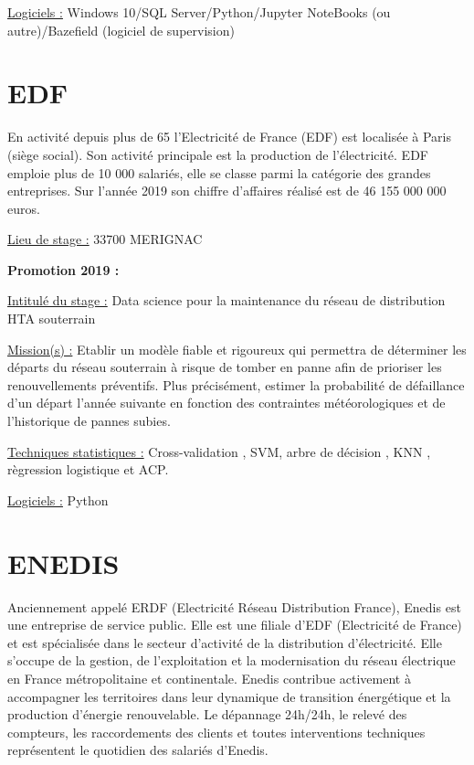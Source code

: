 \documentclass[
  letterpaper,
  DIV=11,
  numbers=noendperiod]{scrreprt}
\begin{document}
\uline{Logiciels :} Windows 10/SQL Server/Python/Jupyter NoteBooks (ou
autre)/Bazefield (logiciel de supervision)

\hypertarget{edf}{%
\section{\texorpdfstring{\textbf{EDF}}{EDF}}\label{edf}}

En activité depuis plus de 65 l'Electricité de France (EDF) est
localisée à Paris (siège social). Son activité principale est la
production de l'électricité. EDF emploie plus de 10 000 salariés, elle
se classe parmi la catégorie des grandes entreprises. Sur l'année 2019
son chiffre d'affaires réalisé est de 46 155 000 000 euros.

\uline{Lieu de stage :} 33700 MERIGNAC

\textbf{Promotion 2019 :}

\uline{Intitulé du stage :} Data science pour la maintenance du réseau
de distribution HTA souterrain

\uline{Mission(s) :} Etablir un modèle fiable et rigoureux qui permettra
de déterminer les départs du réseau souterrain à risque de tomber en
panne afin de prioriser les renouvellements préventifs. Plus
précisément, estimer la probabilité de défaillance d'un départ l'année
suivante en fonction des contraintes météorologiques et de l'historique
de pannes subies.

\uline{Techniques statistiques :} Cross-validation , SVM, arbre de
décision , KNN , règression logistique et ACP.

\uline{Logiciels :} Python

\hypertarget{enedis}{%
\section{\texorpdfstring{\textbf{ENEDIS}}{ENEDIS}}\label{enedis}}

Anciennement appelé ERDF (Electricité Réseau Distribution France),
Enedis est une entreprise de service public. Elle est une filiale d'EDF
(Electricité de France) et est spécialisée dans le secteur d'activité de
la distribution d'électricité. Elle s'occupe de la gestion, de
l'exploitation et la modernisation du réseau électrique en France
métropolitaine et continentale. Enedis contribue activement à
accompagner les territoires dans leur dynamique de transition
énergétique et la production d'énergie renouvelable. Le dépannage
24h/24h, le relevé des compteurs, les raccordements des clients et
toutes interventions techniques représentent le quotidien des salariés
d'Enedis.
\end{document}
